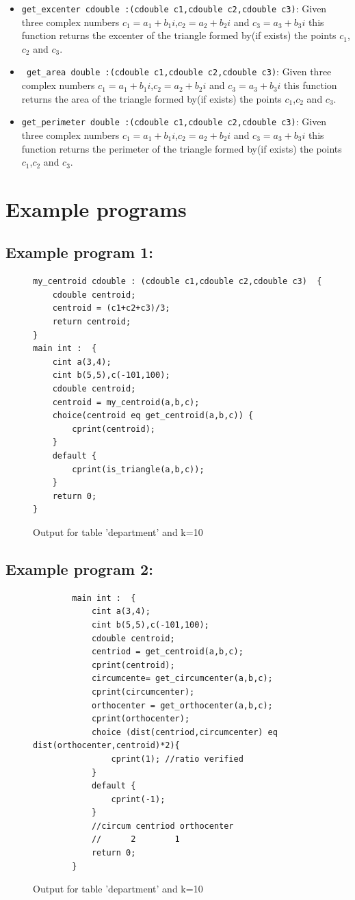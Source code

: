\documentclass[12pt]{article}
\begin{document}
\begin{itemize}
    \item \texttt{get\_excenter cdouble :(cdouble c1,cdouble c2,cdouble c3)}: Given three complex numbers $c_1=a_1+b_1i$,$c_2=a_2+b_2i$ and $c_3=a_3+b_3i$ this function returns the excenter of the triangle formed by(if exists) the points $c_1$,$c_2$ and $c_3$.
    \item \texttt{ get\_area double :(cdouble c1,cdouble c2,cdouble c3)}: Given three complex numbers $c_1=a_1+b_1i$,$c_2=a_2+b_2i$ and $c_3=a_3+b_3i$ this function returns the area of the triangle formed by(if exists) the points $c_1$,$c_2$ and $c_3$.
    \item \texttt{get\_perimeter double :(cdouble c1,cdouble c2,cdouble c3)}: Given three complex numbers $c_1=a_1+b_1i$,$c_2=a_2+b_2i$ and $c_3=a_3+b_3i$ this function returns the perimeter of the triangle formed by(if exists) the points $c_1$,$c_2$ and $c_3$.
\end{itemize}
\section{Example programs}
\subsection{Example program 1:}
\begin{figure}[H]
    \label{ex_program_1}
    \centering
    \begin{BVerbatim}
my_centroid cdouble : (cdouble c1,cdouble c2,cdouble c3)  {
    cdouble centroid;
    centroid = (c1+c2+c3)/3;
    return centroid;
}
main int :  {
    cint a(3,4);
    cint b(5,5),c(-101,100);
    cdouble centroid;
    centroid = my_centroid(a,b,c);
    choice(centroid eq get_centroid(a,b,c)) {
        cprint(centroid);
    } 
    default {
        cprint(is_triangle(a,b,c));
    }
    return 0;
}
    \end{BVerbatim}
    \caption{Output for table 'department' and k=10}
    \end{figure}
\subsection{Example program 2:}
\begin{figure}[H]
    \label{ex_program_2}
    \centering
    \begin{BVerbatim}
        main int :  {
            cint a(3,4);
            cint b(5,5),c(-101,100);
            cdouble centroid;
            centriod = get_centroid(a,b,c);
            cprint(centroid);
            circumcente= get_circumcenter(a,b,c);
            cprint(circumcenter);
            orthocenter = get_orthocenter(a,b,c);
            cprint(orthocenter);
            choice (dist(centriod,circumcenter) eq dist(orthocenter,centroid)*2){
                cprint(1); //ratio verified
            }
            default {
                cprint(-1);
            }
            //circum centriod orthocenter
            //      2        1
            return 0;
        }
            \end{BVerbatim}
    \caption{Output for table 'department' and k=10}
    \end{figure}
\end{document}
